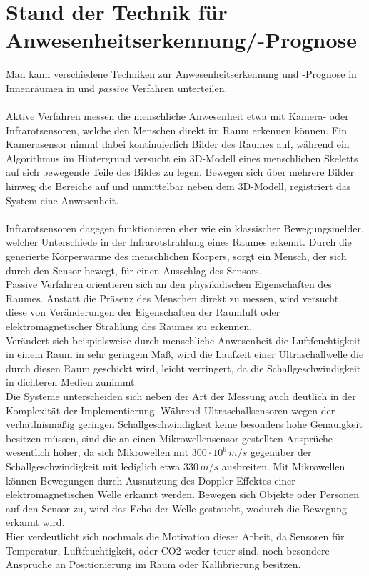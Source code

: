 \clearpage
\chapter{\textbf{Stand der Technik für Anwesenheitserkennung/-Prognose}}\label{grundlagen}

Man kann verschiedene Techniken zur Anwesenheitserkennung und -Prognose in Innenräumen in  und
\textit{passive} Verfahren unterteilen. \\\\
Aktive Verfahren messen die menschliche Anwesenheit etwa mit 
Kamera- oder Infrarotsensoren, welche den Menschen direkt im Raum erkennen können. Ein Kamerasensor nimmt
dabei kontinuierlich Bilder des Raumes auf, während ein Algorithmus im Hintergrund versucht ein 3D-Modell 
eines menschlichen Skeletts auf sich bewegende Teile des Bildes zu legen. Bewegen sich über mehrere Bilder 
hinweg die Bereiche auf und unmittelbar neben dem 3D-Modell, registriert das System eine Anwesenheit.\\\\
Infrarotsensoren dagegen funktionieren eher wie ein klassischer Bewegungsmelder, welcher Unterschiede in der 
Infrarotstrahlung eines Raumes erkennt. Durch die generierte Körperwärme des menschlichen Körpers, sorgt ein
Mensch, der sich durch den Sensor bewegt, für einen Ausschlag des Sensors.\\

Passive Verfahren orientieren sich an den physikalischen Eigenschaften des Raumes. Anstatt die Präsenz des 
Menschen direkt zu messen, wird versucht, diese von Veränderungen der Eigenschaften der Raumluft oder 
elektromagnetischer Strahlung des Raumes zu erkennen. \\
Verändert sich beispielsweise durch menschliche Anwesenheit die Luftfeuchtigkeit 
in einem Raum in sehr geringem Maß, wird die  Laufzeit einer Ultraschallwelle die durch diesen Raum 
geschickt wird, leicht verringert, da die Schallgeschwindigkeit in dichteren Medien zunimmt.\\
Die Systeme unterscheiden sich neben der Art der Messung auch deutlich in der Komplexität der Implementierung.
Während Ultraschallsensoren wegen der verhätlnismäßig geringen Schallgeschwindigkeit keine besonders hohe 
Genauigkeit besitzen müssen, sind die an einen Mikrowellensensor gestellten Ansprüche wesentlich höher, da sich
Mikrowellen mit $300\cdot10^6 \,m/s$ gegenüber der Schallgeschwindigkeit mit lediglich etwa $330\, m/s$ ausbreiten.
Mit Mikrowellen können Bewegungen durch Ausnutzung des Doppler-Effektes einer elektromagnetischen Welle erkannt 
werden. Bewegen sich Objekte oder Personen auf den Sensor zu, wird das Echo der Welle gestaucht, wodurch die 
Bewegung erkannt wird.\\
Hier verdeutlicht sich nochmals die Motivation dieser Arbeit, da Sensoren für Temperatur, Luftfeuchtigkeit, oder CO2
weder teuer sind, noch besondere Ansprüche an Positionierung im Raum oder Kallibrierung besitzen.

